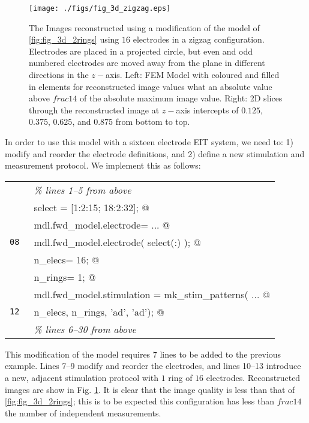 \documentclass[12pt]{iopart}
\makeatletter
\newcommand{\CN}{\tt\small} %
\newcommand{\CC}{&\verb@}   % start code
\newcommand{\CI}{&\it}   % start code
\makeatother
\begin{document}
%
% FIGURE: Zigzag electrode config
%
\begin{figure}[th]
\begin{flushright}
\texttt{[image: ./figs/fig\_3d\_zigzag.eps]}
\caption{\small The 
Images reconstructed using a modification of
the model of \ref{fig:fig_3d_2rings} using $16$
electrodes in a zigzag configuration. Electrodes are placed
in a projected circle, but even and odd numbered electrodes
are moved away from the plane in different directions in the
$z-$axis.
Left: FEM Model with coloured and filled in elements for
reconstructed image values what an absolute value
above $frac{1}{4}$ of the absolute maximum image value.
Right: 2D slices through the reconstructed image at
$z-$axis intercepts of $0.125$, $0.375$, $0.625$, and $0.875$
from bottom to top.
 \label{fig:fig_3d_zigzag}
}
\end{flushright}
\end{figure}

In order to use this model with a sixteen electrode EIT
system, we need to: 1) modify and reorder the electrode
definitions, and 2) define a new stimulation and measurement
protocol. We implement this as follows:

\begin{tabular}{ll}
\CN    \CI \% lines 1--5 from above \\
\CN    \CC select = [1:2:15; 18:2:32]; @\\
\CN    \CC mdl.fwd_model.electrode=  ... @\\
\CN 08 \CC     mdl.fwd_model.electrode( select(:) ); @\\
\CN    \CC n_elecs= 16; @\\
\CN    \CC n_rings= 1; @\\
\CN    \CC mdl.fwd_model.stimulation = mk_stim_patterns( ... @\\
\CN 12 \CC              n_elecs, n_rings, '{ad}', '{ad}'); @\\
\CN    \CI \% lines 6--30 from above \\
\end{tabular}

This modification of the model requires 7 lines to be added
to the previous example. Lines 7--9 modify and reorder the
electrodes, and lines 10--13 introduce a new, adjacent
stimulation protocol with $1$ ring of $16$ electrodes. Reconstructed
images are show in Fig. \ref{fig:fig_3d_zigzag}.
It is clear that the image quality is less than that of
\ref{fig:fig_3d_2rings}; this is to be expected this configuration
has less than $frac{1}{4}$ the number of independent measurements.
 
\end{document}
